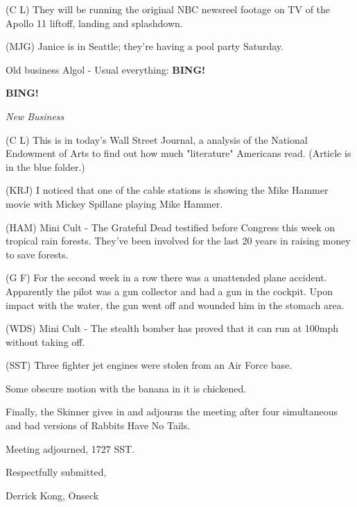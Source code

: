 \documentclass[12pt]{article}
\newcommand{\bing}{{\bf BING!} }
\newcommand{\goto}[1]{\bing \vskip 12pt \centerline{{\em{#1}}}}
\begin{document}
(C L) They will be running the original NBC newsreel footage on TV of the Apollo 11 liftoff, landing and splashdown.

(MJG) Janice is in Seattle; they're having a pool party Saturday.

Old business Algol - Usual everything: \bing

\goto{New Business}

(C L) This is in today's Wall Street Journal, a analysis of the National Endowment of Arts to find out how much "literature" Americans read. (Article is in the blue folder.)

(KRJ) I noticed that one of the cable stations is showing the Mike Hammer movie with Mickey Spillane playing Mike Hammer.

(HAM) Mini Cult - The Grateful Dead testified before Congress this week on tropical rain forests. They've been involved for the last 20 years in raising money to save forests.

(G F) For the second week in a row there was a unattended plane accident. Apparently the pilot was a gun collector and had a gun in the cockpit. Upon impact with the water, the gun went off and wounded him in the stomach area.

(WDS) Mini Cult - The stealth bomber has proved that it can run at 100mph without taking off.

(SST) Three fighter jet engines were stolen from an Air Force base.

Some obscure motion with the banana in it is chickened.

Finally, the Skinner gives in and adjourns the meeting after four simultaneous and bad versions of Rabbits Have No Tails.

\vspace{12pt}

\noindent
Meeting adjourned, 1727 SST.

\vspace{18pt}

\centerline{Respectfully submitted,}
\centerline{Derrick Kong, Onseck}
\end{document}

